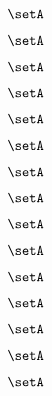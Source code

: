 \begin{forslides}
    \begin{equation}
        \label{eq:slides-processes-155}
        \setA
    \end{equation}

    \begin{equation}
        \label{eq:slides-processes-156}
        \setA
    \end{equation}

    \begin{equation}
        \label{eq:slides-processes-157}
        \setA
    \end{equation}

    \begin{equation}
        \label{eq:slides-processes-158}
        \setA
    \end{equation}

    \begin{equation}
        \label{eq:slides-processes-159}
        \setA
    \end{equation}

    \begin{equation}
        \label{eq:slides-processes-160}
        \setA
    \end{equation}

    \begin{equation}
        \label{eq:slides-processes-161}
        \setA
    \end{equation}

    \begin{equation}
        \label{eq:slides-processes-162}
        \setA
    \end{equation}

    \begin{equation}
        \label{eq:slides-processes-163}
        \setA
    \end{equation}

    \begin{equation}
        \label{eq:slides-processes-164}
        \setA
    \end{equation}

    \begin{equation}
        \label{eq:slides-processes-165}
        \setA
    \end{equation}

    \begin{equation}
        \label{eq:slides-processes-166}
        \setA
    \end{equation}

    \begin{equation}
        \label{eq:slides-processes-167}
        \setA
    \end{equation}

    \begin{equation}
        \label{eq:slides-processes-168}
        \setA
    \end{equation}

    \begin{equation}
        \label{eq:slides-processes-169}
        \setA
    \end{equation}

\end{forslides}